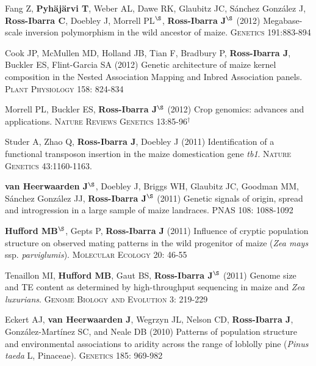 \documentclass[letterpaper]{article}
\begin{document}
\begin{etaremune}
\item Fang Z, {\bf Pyh\"aj\"arvi T}, Weber AL, Dawe RK, Glaubitz JC, S\'{a}nchez Gonz\'{a}lez J, {\bf Ross-Ibarra C}, Doebley J, Morrell PL$^\S$, {\bf Ross-Ibarra J}$^\S$  (2012) Megabase-scale inversion polymorphism in the wild ancestor of maize. \textsc{Genetics} 191:883-894 

\item Cook JP, McMullen MD, Holland JB, Tian F, Bradbury P, {\bf Ross-Ibarra J}, Buckler ES, Flint-Garcia SA (2012) Genetic architecture of maize kernel composition in the Nested Association Mapping and Inbred Association panels.  \textsc{Plant Physiology} 158: 824-834

\item Morrell PL, Buckler ES, {\bf Ross-Ibarra J}$^\S$ (2012) Crop genomics: advances and applications.  \textsc{Nature Reviews Genetics} 13:85-96$^\dagger$

\item Studer A, Zhao Q, {\bf Ross-Ibarra J}, Doebley J (2011) Identification of a functional transposon insertion in the maize domestication gene \emph{tb1}.  \textsc{Nature Genetics} 43:1160-1163.

\item {\bf van Heerwaarden J}$^\S$, Doebley J, Briggs WH, Glaubitz JC, Goodman MM, S\'{a}nchez Gonz\'{a}lez JJ, {\bf Ross-Ibarra J}$^\S$ (2011) Genetic signals of origin, spread and introgression in a large sample of maize landraces. PNAS 108: 1088-1092

\item {\bf Hufford MB}$^\S$, Gepts P, {\bf Ross-Ibarra J} (2011) Influence of cryptic population structure on observed mating patterns in the wild progenitor of maize (\emph{Zea mays} ssp. \emph{parviglumis}).  \textsc{Molecular Ecology} 20: 46-55

\item Tenaillon MI, {\bf Hufford MB}, Gaut BS, {\bf Ross-Ibarra J}$^\S$ (2011)  Genome size and TE content as determined by high-throughput sequencing in maize and \emph{Zea luxurians}.  \textsc{Genome Biology and Evolution } 3: 219-229

\item Eckert AJ, {\bf van Heerwaarden J}, Wegrzyn JL, Nelson CD, {\bf Ross-Ibarra J}, Gonz\'{a}lez-Mart\'{i}nez SC, and Neale DB (2010) Patterns of population structure and environmental associations to aridity across the range of loblolly pine (\emph{Pinus taeda} L, Pinaceae).  \textsc{Genetics} 185: 969-982


\end{etaremune}
\end{document}

